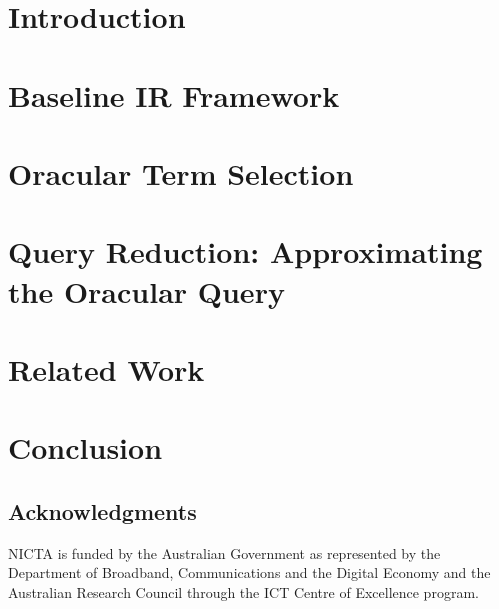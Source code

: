 \documentclass{sig-alternate-2013}
\begin{document}
\section{Introduction}


\section{Baseline IR Framework}
\label{Sec:BaselineIRFramework}


\section{Oracular Term Selection}
\label{Sec:OracularTermSelection}


\section{Query Reduction: Approximating the Oracular Query}
\label{Sec:QueryReduction}


\section{Related Work}
\label{Sec:RelatedWork}


\section{Conclusion}
\label{Sec:Conclusion}


\subsection*{Acknowledgments}
NICTA is funded by the Australian Government as represented by the Department of Broadband, Communications and the Digital Economy and the Australian Research Council through the ICT Centre of Excellence program.
\end{document}
